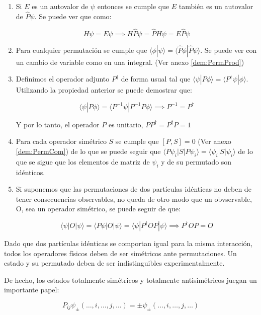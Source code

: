 \documentclass{article} %
\begin{document}
\begin{enumerate}
\item Si $E$ es un autovalor de $\psi$ entonces se cumple que $E$ también es un autovalor de $\hat{P} \psi$. Se puede ver que como:

$$
H \psi = E \psi \implies H \hat{P} \psi = \hat{P} H \psi = E \hat{P} \psi
$$

\item Para cualquier permutación se cumple que $\langle \phi | \psi \rangle = \langle \hat{P} \phi | \hat{P} \psi \rangle$. Se puede ver con un cambio de variable como en una integral. (Ver anexo \ref{dem:PermProd})

\item Definimos el operador adjunto $P^{\dagger}$ de forma usual tal que $\langle \psi | P \phi \rangle = \langle P^{\dagger} \psi | \phi \rangle$. Utilizando la propiedad anterior se puede demostrar que:

$$
\langle \psi | P \phi \rangle = \langle P^{-1} \psi | P^{-1} P \phi \rangle \implies P^{-1} = P^{\dagger}
$$

Y por lo tanto, el operador $P$ es unitario, $PP^{\dagger} = P^{\dagger} P = 1$

\item Para cada operador simétrico $S$ se cumple que $[P, S] = 0$ (Ver anexo \ref{dem:PermCom}) de lo que se puede seguir que $\langle P \psi_i | S | P \psi_i \rangle = \langle \psi_i | S | \psi_i \rangle$ de lo que se sigue que los elementos de matriz de $\psi_i$ y de su permutado son idénticos.

\item Si suponemos que las permutaciones de dos partículas idénticas no deben de tener consecuencias observables, no queda de otro modo que un obvservable, O, sea un operador simétrico, se puede seguir de que:

$$
\langle \psi | O | \psi \rangle = \langle P \psi | O | \psi \rangle = \langle \psi | P^{\dagger} O P | \psi \rangle \implies P^{\dagger} O P = O
$$
\end{enumerate}

Dado que dos partículas idénticas se comportan igual para la misma interacción, todos los operadores físicos deben de ser simétricos ante permutaciones. Un estado y su permutado deben de ser indistinguibles experimentalmente.

De hecho, los estados totalmente simétricos y totalmente antisimétricos juegan un importante papel:

$$
P_{ij} \psi_{\pm} (\ldots, i, \ldots, j, \ldots) = \pm \psi_{\pm} (\ldots, i, \ldots, j, \ldots)
$$
\end{document}
